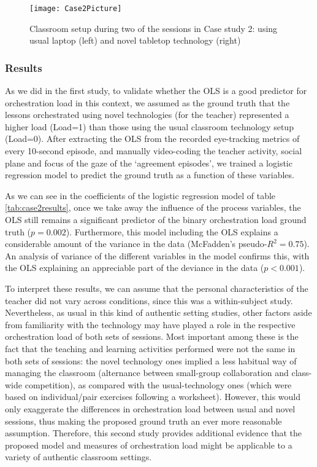 \documentclass[10pt,journal,compsoc]{IEEEtran}
\begin{document}
\begin{figure}[!t]
\centering
\texttt{[image: Case2Picture]}
\caption{Classroom setup during two of the sessions in Case study 2: using usual laptop (left) and novel tabletop technology (right)}
\label{fig:case2picture}
\end{figure}

\subsubsection{Results}

As we did in the first study, to validate whether the OLS is a good predictor for orchestration load in this context, we assumed as the ground truth that the lessons orchestrated using novel technologies (for the teacher) represented a higher load (Load=1) than those using the usual classroom technology setup (Load=0). After extracting the OLS from the recorded eye-tracking metrics of every 10-second episode, and manually video-coding the teacher activity, social plane and focus of the gaze of the `agreement episodes', we trained a logistic regression model to predict the ground truth as a function of these variables.

As we can see in the coefficients of the logistic regression model of table \ref{tab:case2results}, once we take away the influence of the process variables, the OLS still remains a significant predictor of the binary orchestration load ground truth ($p=0.002$). Furthermore, this model including the OLS explains a considerable amount of the variance in the data (McFadden's pseudo-$R^2=0.75$). An analysis of variance of the different variables in the model confirms this, with the OLS explaining an appreciable part of the deviance in the data ($p<0.001$). 

To interpret these results, we can assume that the personal characteristics of the teacher did not vary across conditions, since this was a within-subject study. Nevertheless, as usual in this kind of authentic setting studies, other factors aside from familiarity with the technology may have played a role in the respective orchestration load of both sets of sessions. Most important among these is the fact that the teaching and learning activities performed were not the same in both sets of sessions: the novel technology ones implied a less habitual way of managing the classroom (alternance between small-group collaboration and class-wide competition), as compared with the usual-technology ones (which were based on individual/pair exercises following a worksheet). However, this would only exaggerate the differences in orchestration load between usual and novel sessions, thus making the proposed ground truth an ever more reasonable assumption. Therefore, this second study provides additional evidence that the proposed model and measures of orchestration load might be applicable to a variety of authentic classroom settings.
\end{document}
